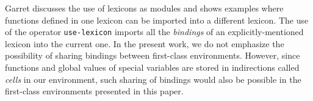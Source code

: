 Garret discusses the use of lexicons as modules and shows examples
where functions defined in one lexicon can be imported into a
different lexicon.  The use of the operator \texttt{use-lexicon}
imports all the \emph{bindings} of an explicitly-mentioned lexicon
into the current one.  In the present work, we do not emphasize the
possibility of sharing bindings between first-class environments.
However, since functions and global values of special variables are
stored in indirections called \emph{cells} in our environment, such
sharing of bindings would also be possible in the first-class
environments presented in this paper.
